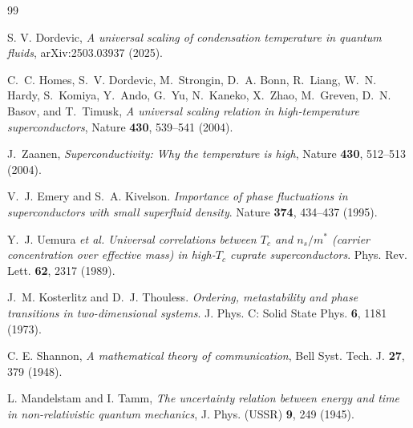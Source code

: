 \documentclass[11pt,a4paper]{article}
\begin{document}

\vspace{0.5cm}
\renewcommand{\refname}{\normalsize \textbf{References}} 
\begin{thebibliography}{99}
\setlength{\itemsep}{0pt} 

S. V. Dordevic, \textit{A universal scaling of condensation temperature in quantum fluids}, arXiv:2503.03937 (2025).

C.~C. Homes, S.~V. Dordevic, M.~Strongin, D.~A. Bonn, R.~Liang, W.~N. Hardy, S.~Komiya, Y.~Ando, G.~Yu, N.~Kaneko, X.~Zhao, M.~Greven, D.~N. Basov, and T.~Timusk,
\textit{A universal scaling relation in high-temperature superconductors},
Nature \textbf{430}, 539--541 (2004).

J.~Zaanen,
\textit{Superconductivity: Why the temperature is high},
Nature \textbf{430}, 512--513 (2004).

V.~J. Emery and S.~A. Kivelson.
\newblock \textit{Importance of phase fluctuations in superconductors with small superfluid density}.
\newblock Nature \textbf{374}, 434--437 (1995).

Y.~J. Uemura \textit{et al.}
\newblock \textit{Universal correlations between $T_c$ and $n_s/m^*$ (carrier concentration over effective mass) in high-$T_c$ cuprate superconductors}.
\newblock Phys. Rev. Lett. \textbf{62}, 2317 (1989).

J.~M. Kosterlitz and D.~J. Thouless.
\newblock \textit{Ordering, metastability and phase transitions in two-dimensional systems}.
\newblock J. Phys. C: Solid State Phys. \textbf{6}, 1181 (1973).

C. E. Shannon, \textit{A mathematical theory of communication}, Bell Syst. Tech. J. \textbf{27}, 379 (1948).

L. Mandelstam and I. Tamm, \textit{The uncertainty relation between energy and time in non-relativistic quantum mechanics}, J. Phys. (USSR) \textbf{9}, 249 (1945).


\end{thebibliography}
\end{document}
